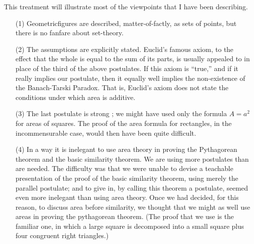 This treatment will illustrate most of the viewpoints that I have been
describing.
\begin{itemize}
\item[(1)] Geometric\pageoriginale figures are described,
  matter-of-factly, as sets of points, but there is no fanfare about set-theory.

\item[(2)] The assumptions are explicitly stated. Euclid's famous
  axiom, to the effect that the whole is equal to the sum of its
  parts, is usually appealed to in place of the third of the above
  postulates. If this axiom is ``true,'' and if it really implies our
  postulate, then it equally well implies the non-existence of the
  Banach-Tarski Paradox. That is, Euclid's axiom does not state the
  conditions under which area is additive.

\item[(3)] The last postulate is strong ; we might have used only the
  formula $A = a^2$ for areas of squares. The proof of the area
  formula for rectangles, in the incommensurable case, would then have
  been quite difficult. 

\item[(4)] In a way it is inelegant to use area theory in proving the
  Pythagorean theorem and the basic similarity theorem. We are using
  more postulates than are needed. The difficulty was that we were
  unable to devise a teachable presentation of the proof of the basic
  similarity theorem, using merely the parallel postulate; and to give
  in, by calling this theorem a postulate, seemed even more inelegant
  than using area theory. Once we had decided, for this reason, to
  discuss area before similarity, we thought that we might as well use
  areas in proving the pythagorean theorem. (The proof that we use is
  the familiar one, in which a large square is decomposed into a small
  square plus four  congruent right triangles.)


\end{itemize}

